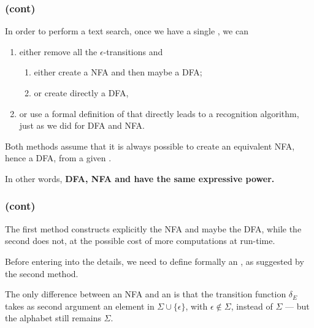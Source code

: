 %
\begin{frame}
\frametitle{\eNFA (cont)}

In order to perform a text search, once we have a single \eNFA, we can
\begin{enumerate}

  \item either remove all the \(\epsilon\)-transitions and
  \begin{enumerate}
    \item either create a NFA and then maybe a DFA;

    \item or create directly a DFA,

  \end{enumerate}

  \item or use a formal definition of \eNFA that directly leads to a
  recognition algorithm, just as we did for DFA and NFA.

\end{enumerate}
Both methods assume that it is always possible to create an equivalent
NFA, hence a DFA, from a given \eNFA.

\bigskip

In other words, \textbf{DFA, NFA and \eNFA have the same expressive
  power.}

\end{frame}

%
\begin{frame}
\frametitle{\eNFA (cont)}

The first method constructs explicitly the NFA and maybe the DFA,
while the second does not, at the possible cost of more computations
at run-time.

\bigskip

Before entering into the details, we need to define formally an
\eNFA, as suggested by the second method.

\bigskip

The only difference between an NFA and an \eNFA is that the
transition function \(\delta_E\) takes as second argument an element
in \(\Sigma \cup \{\epsilon\}\), with \(\epsilon \not\in \Sigma\),
instead of \(\Sigma\) --- but the alphabet still remains \(\Sigma\).

\end{frame}

